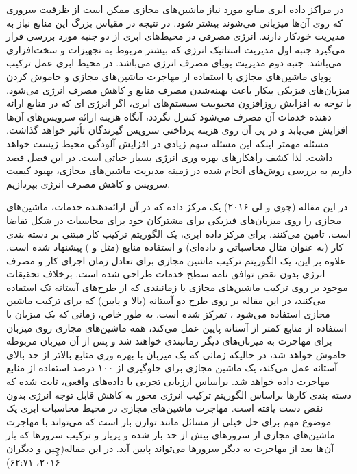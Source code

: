 \label{فصل‌تاریخچه}
  در مراکز داده ابری منابع مورد نیاز ماشین‌های مجازی ممکن است از ظرفیت سروری که روی آن‌ها میزبانی می‌شوند بیشتر شود. در نتیجه در مقیاس بزرگ این منابع نیاز به مدیریت خودکار دارند. انرژی مصرفی در محیط‌های ابری از دو جنبه مورد بررسی قرار  می‌گیرد جنبه اول مدیریت استاتیک انرژی که بیشتر مربوط به تجهیزات و سخت‌افزاری می‌باشد. جنبه دوم مدیریت پویای مصرف انرژی می‌باشد. در محیط ابری عمل  ترکیب پویای ماشین‌های مجازی با استفاده از مهاجرت ماشین‌های مجازی و خاموش ­کردن میزبان‌های فیزیکی بیکار باعث 
 بهینه‌شدن  مصرف منابع و کاهش مصرف انرژی می­‌شود­. با توجه به افزایش روزافزون محبوبیت سیستم‌های ابری، اگر انرژی ای که در منابع ارائه دهنده خدمات آن مصرف می‌شود کنترل نگردد، آنگاه هزینه ارائه سرویس‌های آن‌ها  افزایش می‌یابد و در پی آن روی هزینه پرداختی سرویس گیرندگان تأثیر خواهد گذاشت. مسئله مهمتر اینکه این مسئله سهم زیادی در افزایش آلودگی محیط زیست خواهد داشت. لذا کشف راهکارهای بهره وری انرژی بسیار حیاتی است. در این فصل قصد داریم به بررسی روش‌های انجام شده در زمینه مدیریت ماشین‌های مجازی، بهبود کیفیت سرویس و کاهش مصرف انرژی بپردازیم.
 

در این مقاله
(چوی و لی ۲۰۱۶)
یک مرکز داده که در آن ارائه‌دهنده خدمات، ماشین‌های مجازی را روی میزبان‌های فیزیکی برای مشترکان خود برای محاسبات در شکل تقاضا است، تامین می‌کنند. برای مرکز داده ابری، یک الگوریتم ترکیب کار مبتنی بر دسته بندی کار (به عنوان مثال محاسباتی و داده‌ای) و استفاده منابع (مثل 
  و
   ) پیشنهاد شده است. علاوه بر این، یک الگوریتم ترکیب ماشین مجازی برای تعادل زمان اجرای کار و مصرف انرژی بدون نقض توافق نامه سطح خدمات
     طراحی شده است. برخلاف تحقیقات موجود بر روی ترکیب ماشین‌های مجازی یا زمانبندی که از طرح‌های آستانه تک استفاده می‌کنند، در این مقاله بر روی  طرح دو آستانه (بالا و پایین) که برای ترکیب ماشین مجازی استفاده می‌شود ، تمرکز شده است. به طور خاص، زمانی که یک میزبان با استفاده از منابع کمتر از آستانه پایین عمل می‌کند، همه ماشین‌های مجازی روی میزبان برای مهاجرت به میزبان‌های دیگر زمانبندی خواهند شد و پس از آن میزبان مربوطه خاموش خواهد شد، در حالیکه زمانی که یک میزبان با بهره وری منابع بالاتر از حد بالای آستانه عمل می‌کند، یک ماشین مجازی برای جلوگیری از  ۱۰۰ درصد استفاده از منابع مهاجرت داده خواهد شد. براساس ارزیابی تجربی با داده‌های واقعی، ثابت شده که دسته بندی کارها براساس الگوریتم ترکیب انرژی محور به کاهش قابل توجه انرژی بدون نقض 
       دست یافته است.
  مهاجرت ماشین‌های مجازی در محیط محاسبات ابری یک موضوع مهم برای حل خیلی از مسائل مانند توازن بار است که می‌تواند با  مهاجرت ماشین‌های مجازی از سرورهای بیش از حد بار شده و پربار و ترکیب سرورها که بار آن‌ها بعد از مهاجرت به دیگر سرورها می‌تواند پایین آید. در این مقاله(چِین و دیگران ۲۰۱۶، ۶۲:۷۱)
  
